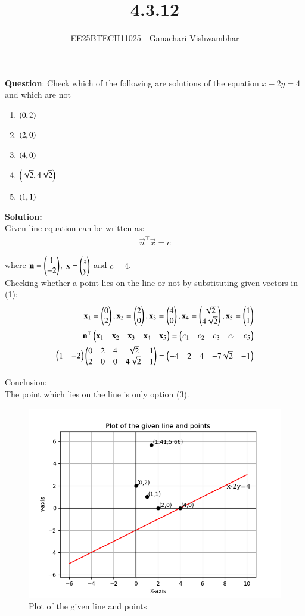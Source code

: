 \documentclass[journal]{IEEEtran}
\begin{document}
\title{4.3.12}
\author{EE25BTECH11025 - Ganachari Vishwambhar}
\maketitle

\textbf{Question}:\newline
Check which of the following are solutions of the equation $x-2y=4$ and which are not\\
\begin{enumerate}
    \item $\left(0,2\right)$
    \item $\left(2,0\right)$
    \item $\left(4,0\right)$
    \item $\left(\sqrt{2},4\sqrt{2}\right)$
    \item $\left(1,1\right)$
\end{enumerate}
\textbf{Solution: }\\

Given line equation can be written as:
\begin{align}
    \vec{n}^\top\vec{x}=c
\end{align}

where $\mathbf{n}=\begin{pmatrix}1\\-2\end{pmatrix}$, $\mathbf{x}=\begin{pmatrix}x\\y\end{pmatrix}$ and $c=4$.\\

Checking whether a point lies on the line or not by substituting given vectors in (1):
\begin{align}
    \mathbf{x}_1=\begin{pmatrix}0\\2\end{pmatrix}, \mathbf{x}_2=\begin{pmatrix}2\\0\end{pmatrix}, \mathbf{x}_3=\begin{pmatrix}4\\0\end{pmatrix}, \mathbf{x}_4=\begin{pmatrix}\sqrt{2}\\4\sqrt{2}\end{pmatrix}, \mathbf{x}_5=\begin{pmatrix}1\\1\end{pmatrix}\\
    \mathbf{n}^\top\begin{pmatrix}\mathbf{x}_1&\mathbf{x}_2&\mathbf{x}_3&\mathbf{x}_4&\mathbf{x}_5\end{pmatrix}=\begin{pmatrix}c_1&c_2&c_3&c_4&c_5\end{pmatrix}\\
    \begin{pmatrix}1&-2\end{pmatrix}\begin{pmatrix}0&2&4&\sqrt{2}&1\\2&0&0&4\sqrt{2}&1\end{pmatrix}=\begin{pmatrix}-4&2&4&-7\sqrt{2}&-1\end{pmatrix}\\
\end{align}

Conclusion:\\

The point which lies on the line is only option (3).

\begin{figure}[h!]
   \centering
   \includegraphics[width=0.7\linewidth]{figs/plot.png}
   \caption{Plot of the given line and points}
   \label{}
\end{figure}
\end{document}
